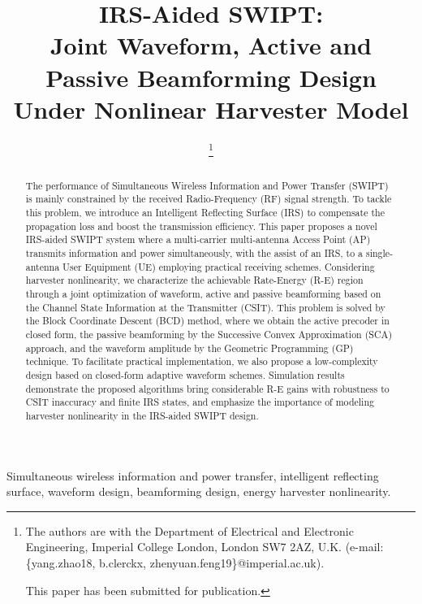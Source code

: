 \documentclass[journal]{IEEEtran}
\begin{document}
	\title{IRS-Aided SWIPT:\\Joint Waveform, Active and Passive Beamforming Design Under Nonlinear Harvester Model}
	\author{
		\thanks{
			The authors are with the Department of Electrical and Electronic Engineering, Imperial College London, London SW7 2AZ, U.K. (e-mail: \{yang.zhao18, b.clerckx, zhenyuan.feng19\}@imperial.ac.uk).

			This paper has been submitted for publication.
		}
	}
	\maketitle


	\begin{abstract}
		The performance of Simultaneous Wireless Information and Power Transfer (SWIPT) is mainly constrained by the received Radio-Frequency (RF) signal strength. To tackle this problem, we introduce an Intelligent Reflecting Surface (IRS) to compensate the propagation loss and boost the transmission efficiency. This paper proposes a novel IRS-aided SWIPT system where a multi-carrier multi-antenna Access Point (AP) transmits information and power simultaneously, with the assist of an IRS, to a single-antenna User Equipment (UE) employing practical receiving schemes. Considering harvester nonlinearity, we characterize the achievable Rate-Energy (R-E) region through a joint optimization of waveform, active and passive beamforming based on the Channel State Information at the Transmitter (CSIT). This problem is solved by the Block Coordinate Descent (BCD) method, where we obtain the active precoder in closed form, the passive beamforming by the Successive Convex Approximation (SCA) approach, and the waveform amplitude by the Geometric Programming (GP) technique. To facilitate practical implementation, we also propose a low-complexity design based on closed-form adaptive waveform schemes. Simulation results demonstrate the proposed algorithms bring considerable R-E gains with robustness to CSIT inaccuracy and finite IRS states, and emphasize the importance of modeling harvester nonlinearity in the IRS-aided SWIPT design.
	\end{abstract}


	\begin{IEEEkeywords}
		Simultaneous wireless information and power transfer, intelligent reflecting surface, waveform design, beamforming design, energy harvester nonlinearity.
	\end{IEEEkeywords}
\end{document}
